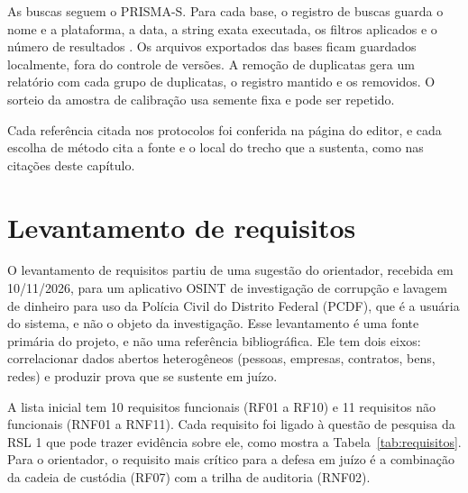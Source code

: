 As buscas seguem o PRISMA-S. Para cada base, o registro de buscas guarda o
nome e a plataforma, a data, a string exata executada, os filtros aplicados e
o número de resultados \cite[itens 1, 8, 9, 13 e 15]{rethlefsen2021}. Os
arquivos exportados das bases ficam guardados localmente, fora do controle de
versões. A remoção de duplicatas gera um relatório com cada grupo de
duplicatas, o registro mantido e os removidos. O sorteio da amostra de
calibração usa semente fixa e pode ser repetido.

Cada referência citada nos protocolos foi conferida na página do editor, e
cada escolha de método cita a fonte e o local do trecho que a sustenta, como
nas citações deste capítulo.

\section{Levantamento de requisitos}
\label{sec:metodologia-requisitos}

O levantamento de requisitos partiu de uma sugestão do orientador, recebida em
10/11/2026, para um aplicativo OSINT de investigação de corrupção e lavagem de
dinheiro para uso da Polícia Civil do Distrito Federal (PCDF), que é a
usuária do sistema, e não o objeto da investigação. Esse levantamento é uma
fonte primária do projeto, e não uma referência bibliográfica. Ele tem dois
eixos: correlacionar dados abertos heterogêneos (pessoas, empresas, contratos,
bens, redes) e produzir prova que se sustente em juízo.

A lista inicial tem 10 requisitos funcionais (RF01 a RF10) e 11 requisitos não
funcionais (RNF01 a RNF11). Cada requisito foi ligado à questão de pesquisa da
RSL 1 que pode trazer evidência sobre ele, como mostra a
Tabela~\ref{tab:requisitos}. Para o orientador, o requisito mais crítico para
a defesa em juízo é a combinação da cadeia de custódia (RF07) com a trilha de
auditoria (RNF02).

